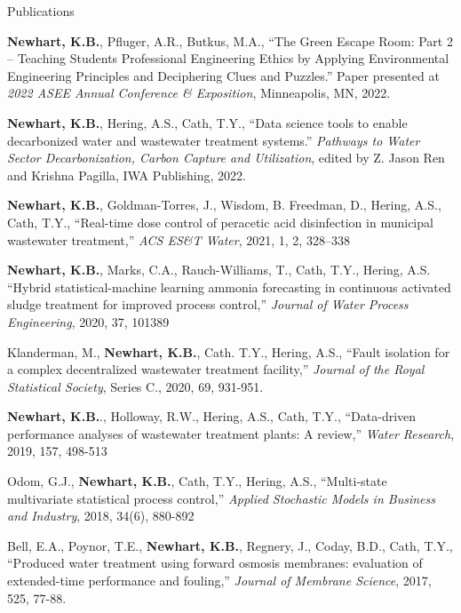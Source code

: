 \documentclass{resume} %
\begin{document}
{\begin{rSection}{Publications}
\begin{etaremune}
	\item\textbf{Newhart, K.B.}, Pfluger, A.R., Butkus, M.A., ``The Green Escape Room: Part 2 – Teaching Students Professional Engineering Ethics by Applying Environmental Engineering Principles and Deciphering Clues and Puzzles.'' Paper presented at \emph{2022 ASEE Annual Conference \& Exposition}, Minneapolis, MN, 2022.

	\item \textbf{Newhart, K.B.}, Hering, A.S., Cath, T.Y., ``Data science tools to enable decarbonized water and wastewater treatment systems.'' \emph{Pathways to Water Sector Decarbonization, Carbon Capture and Utilization}, edited by Z. Jason Ren and Krishna Pagilla, IWA Publishing, 2022.

	\item \textbf{Newhart, K.B.}, Goldman-Torres, J., Wisdom, B. Freedman, D., Hering, A.S., Cath, T.Y., ``Real-time dose control of peracetic acid disinfection in municipal wastewater treatment,'' \emph{ACS ES\&T Water}, 2021, 1, 2, 328–338

	\item \textbf{Newhart, K.B.}, Marks, C.A., Rauch-Williams, T., Cath, T.Y., Hering, A.S. ``Hybrid statistical-machine learning ammonia forecasting in continuous activated sludge treatment for improved process control,'' \emph{Journal of Water Process Engineering}, 2020, 37, 101389

	\item Klanderman, M., \textbf{Newhart, K.B.}, Cath. T.Y., Hering, A.S., ``Fault isolation for a complex decentralized wastewater treatment facility,'' \emph{Journal of the Royal Statistical Society}, Series C., 2020, 69, 931-951.

	\item \textbf{Newhart, K.B.}., Holloway, R.W., Hering, A.S., Cath, T.Y., ``Data-driven performance analyses of wastewater treatment plants: A review,'' \emph{Water Research}, 2019, 157, 498-513

	\item Odom, G.J., \textbf{Newhart, K.B.}, Cath, T.Y., Hering, A.S., ``Multi-state multivariate statistical process control,'' \emph{Applied Stochastic Models in Business and Industry}, 2018, 34(6), 880-892

	\item Bell, E.A., Poynor, T.E., \textbf{Newhart, K.B.}, Regnery, J., Coday, B.D., Cath, T.Y., ``Produced water treatment using forward osmosis membranes: evaluation of extended-time performance and fouling,'' \emph{Journal of Membrane Science}, 2017, 525, 77-88.
\end{etaremune}

\end{rSection}
}
\end{document}
